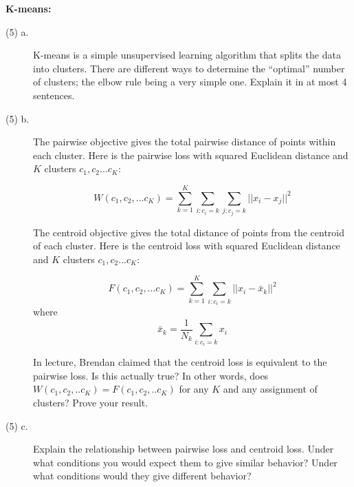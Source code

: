 \documentclass[11pt]{article}
\begin{document}
\begin{problem}{15}\textbf{K-means:}
\begin{description}
\item[(5) a.] K-means is a simple unsupervised learning algorithm that splits the data into clusters. There are different ways to determine the ``optimal'' number of clusters; the elbow rule being a very simple one. Explain it in at most 4 sentences.
\item[(5) b.] The pairwise objective gives the total pairwise distance of points within each cluster.  Here is the pairwise loss with squared Euclidean distance and $K$ clusters $c_1,c_2...c_K$:

$$W(c_1,c_2,...c_K) = \sum_{k=1}^K \sum_{i:c_i = k} \sum_{j:c_j = k} ||x_i -x_j||^2$$

The centroid objective gives the total distance of points from the centroid of each cluster.  Here is the centroid loss with squared Euclidean distance and $K$ clusters $c_1,c_2...c_K$:

$$F(c_1,c_2,...c_K)=\sum_{k=1}^K \sum_{i:c_i = k} ||x_i - \bar{x}_k||^2$$
where 
$$\bar{x}_k = \frac{1}{N_k} \sum_{i:c_i = k} x_i$$

In lecture, Brendan claimed that the centroid loss is equivalent to the pairwise loss. Is this actually true?   In other words, does $W(c_1,c_2,..c_K) = F(c_1,c_2,..c_K)$ for any $K$ and any assignment of clusters? Prove your result.  

\item[(5) c.]Explain the relationship between pairwise loss and centroid loss.   Under what conditions you would expect them to give similar behavior?  Under what conditions would they give different behavior?
\end{description}
\end{problem}
\newpage
\end{document}
